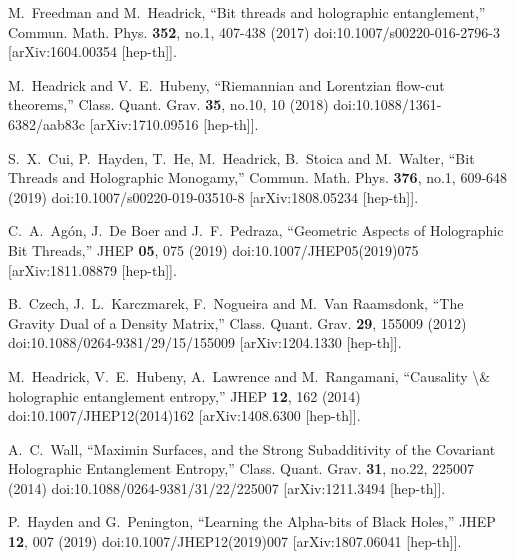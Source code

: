 \documentclass[a4paper,12pt]{article}
\begin{document}
\begin{thebibliography}{}
M.~Freedman and M.~Headrick,
``Bit threads and holographic entanglement,''
Commun. Math. Phys. \textbf{352}, no.1, 407-438 (2017)
doi:10.1007/s00220-016-2796-3
[arXiv:1604.00354 [hep-th]].

M.~Headrick and V.~E.~Hubeny,
``Riemannian and Lorentzian flow-cut theorems,''
Class. Quant. Grav. \textbf{35}, no.10, 10 (2018)
doi:10.1088/1361-6382/aab83c
[arXiv:1710.09516 [hep-th]].

S.~X.~Cui, P.~Hayden, T.~He, M.~Headrick, B.~Stoica and M.~Walter,
``Bit Threads and Holographic Monogamy,''
Commun. Math. Phys. \textbf{376}, no.1, 609-648 (2019)
doi:10.1007/s00220-019-03510-8
[arXiv:1808.05234 [hep-th]].

C.~A.~Ag\'on, J.~De Boer and J.~F.~Pedraza,
``Geometric Aspects of Holographic Bit Threads,''
JHEP \textbf{05}, 075 (2019)
doi:10.1007/JHEP05(2019)075
[arXiv:1811.08879 [hep-th]].

B.~Czech, J.~L.~Karczmarek, F.~Nogueira and M.~Van Raamsdonk,
``The Gravity Dual of a Density Matrix,''
Class. Quant. Grav. \textbf{29}, 155009 (2012)
doi:10.1088/0264-9381/29/15/155009
[arXiv:1204.1330 [hep-th]].

M.~Headrick, V.~E.~Hubeny, A.~Lawrence and M.~Rangamani,
``Causality \textbackslash{}\& holographic entanglement entropy,''
JHEP \textbf{12}, 162 (2014)
doi:10.1007/JHEP12(2014)162
[arXiv:1408.6300 [hep-th]].

A.~C.~Wall,
``Maximin Surfaces, and the Strong Subadditivity of the Covariant Holographic Entanglement Entropy,''
Class. Quant. Grav. \textbf{31}, no.22, 225007 (2014)
doi:10.1088/0264-9381/31/22/225007
[arXiv:1211.3494 [hep-th]].

P.~Hayden and G.~Penington,
``Learning the Alpha-bits of Black Holes,''
JHEP \textbf{12}, 007 (2019)
doi:10.1007/JHEP12(2019)007
[arXiv:1807.06041 [hep-th]].


\end{thebibliography}
\end{document}
